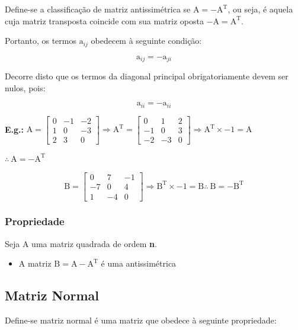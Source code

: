 \documentclass[a4paper,12pt]{article}
\begin{document}
Define-se a classificação de matriz antissimétrica se $ \text{A} = -\text{A}^{\text{T}} $, ou seja, é aquela cuja matriz transposta coincide com sua matriz oposta $ -\text{A} = \text{A}^{\text{T}} $.

Portanto, os termos $ \text{a}_{ij} $ obedecem à seguinte condição:

$$ \text{a}_{ij} = -\text{a}_{ji} $$

Decorre disto que os termos da diagonal principal obrigatoriamente devem ser nulos, pois:

$$ \text{a}_{ii} = -\text{a}_{ii} $$

\textbf{E.g.:} $  \text{A} =  \begin{bmatrix}
0 & -1 & -2 \\
1 & 0 & -3 \\
2 & 3 & 0
\end{bmatrix}  \Rightarrow \text{A}^{\text{T}} =  \begin{bmatrix}
0 & 1 & 2 \\
-1 & 0 & 3 \\
-2 & -3 & 0
\end{bmatrix} \Rightarrow \text{A}^{\text{T}} \times -1 = \text{A} $

$ \therefore \ \text{A} = -\text{A}^{\text{T}} $

$$ \text{B} = \begin{bmatrix}
0 & 7 & -1 \\
-7 & 0 & 4 \\
1 & -4 & 0
\end{bmatrix} \Rightarrow \text{B}^{\text{T}} \times -1 = \text{B}
\therefore \ \text{B} = -\text{B}^{\text{T}}$$


\subsubsection{Propriedade}

Seja $\text{A}$ uma matriz quadrada de ordem \textbf{n}.

\begin{itemize}
    \item A matriz $\text{B} = \text{A} - \text{A}^{\text{T}}$ é uma antissimétrica
\end{itemize}

\subsection{Matriz Normal}

Define-se matriz normal é uma matriz que obedece à seguinte propriedade:
\end{document}
